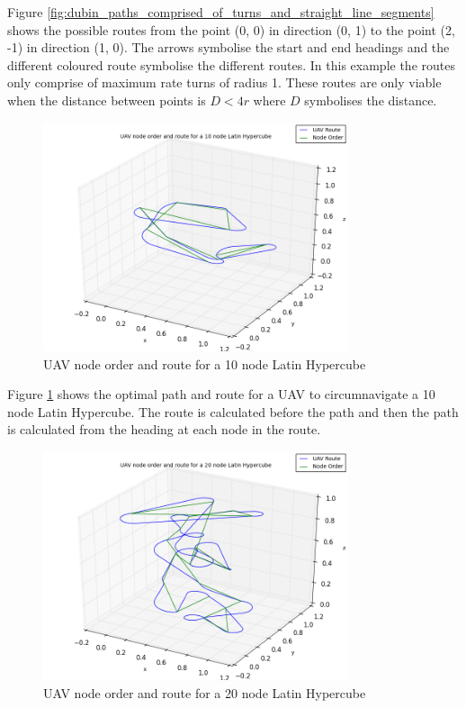 \documentclass[a4paper,12pt,twoside]{article}
\begin{document}
Figure \ref{fig:dubin_paths_comprised_of_turns_and_straight_line_segments} shows the possible routes from the point (0, 0) in direction (0, 1) to the point (2, -1) in direction (1, 0). The arrows symbolise the start and end headings and the different coloured route symbolise the different routes. In this example the routes only comprise of maximum rate turns of radius 1. These routes are only viable when the distance between points is $D<4r$ where $D$ symbolises the distance.

\begin{figure}[H]
\centering
\includegraphics[width=0.8\textwidth]{figures/uav_node_order_and_route_for_a_10_node_latin_hypercube.png} 
\caption{UAV node order and route for a 10 node Latin Hypercube}
\label{fig:uav_node_order_and_route_for_a_10_node_latin_hypercube}
\end{figure}

Figure \ref{fig:uav_node_order_and_route_for_a_10_node_latin_hypercube} shows the optimal path and route for a UAV to circumnavigate a 10 node Latin Hypercube. The route is calculated before the path and then the path is calculated from the heading at each node in the route.

\begin{figure}[H]
\centering
\includegraphics[width=0.8\textwidth]{figures/uav_node_order_and_route_for_a_20_node_latin_hypercube.png} 
\caption{UAV node order and route for a 20 node Latin Hypercube}
\label{fig:uav_node_order_and_route_for_a_20_node_latin_hypercube}
\end{figure}
\end{document}
